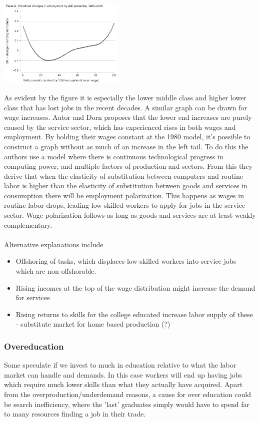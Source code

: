 \documentclass[12pt, a4paper]{article}
\begin{document}
\begin{multicols}{2}
\includegraphics[width = 0.45\textwidth]{empl.jpg}

As evident by the figure it is especially the lower middle class and higher lower class that has lost jobs in the recent decades. A similar graph can be drawn for wage increases. Autor and Dorn proposes that the lower end increases are purely caused by the service sector, which has experienced rises in both wages and employment. By holding their wages constant at the 1980 model, it's possible to construct a graph without as much of an increase in the left tail. To do this the authors use a model where there is continuous technological progress in computing power, and multiple factors of production and sectors. From this they derive that when the elasticity of substitution between computers and routine labor is higher than the elasticity of substitution between goods and services in consumption there will be employment polarization. This happens as wages in routine labor drops, leading low skilled workers to apply for jobs in the service sector. Wage polarization follows as long as goods and services are at least weakly complementary. 
\\ \\
Alternative explanations include
\begin{itemize}
\item Offshoring of tasks, which displaces low-skilled workers into service jobs which are non offshorable. 
\item Rising incomes at the top of the wage distribution might increase the demand for services
\item Rising returns to skills for the college educated increase labor supply of these - substitute market for home based production (?) 
\end{itemize}

\subsubsection{Overeducation}
Some speculate if we invest to much in education relative to what the labor market can handle and demands. In this case workers will end up having jobs which require much lower skills than what they actually have acquired. Apart from the overproduction/underdemand reasons, a cause for over education could be search inefficiency, where the 'last' graduates simply would have to spend far to many resources finding a job in their trade.


\end{multicols}
\end{document}
